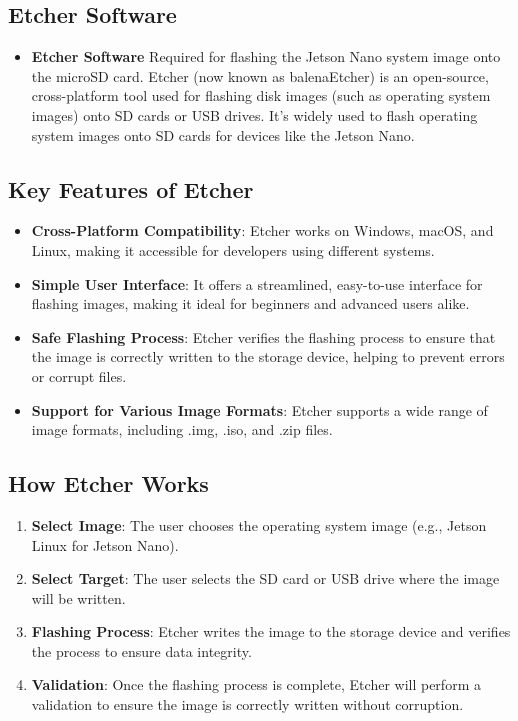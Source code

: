\subsection{Etcher Software}
\begin{itemize}
	\item \textbf{Etcher Software} Required for flashing the Jetson Nano system image onto the microSD card. Etcher (now known as balenaEtcher) is an open-source, cross-platform tool used for flashing disk images (such as operating system images) onto SD cards or USB drives. It's widely used to flash operating system images onto SD cards for devices like the Jetson Nano. \cite{BAC:2025}
\end{itemize}

\subsection*{Key Features of Etcher}
\begin{itemize}
	\item \textbf{Cross-Platform Compatibility}: Etcher works on Windows, macOS, and Linux, making it accessible for developers using different systems.
	\item \textbf{Simple User Interface}: It offers a streamlined, easy-to-use interface for flashing images, making it ideal for beginners and advanced users alike.
	\item \textbf{Safe Flashing Process}: Etcher verifies the flashing process to ensure that the image is correctly written to the storage device, helping to prevent errors or corrupt files.
	\item \textbf{Support for Various Image Formats}: Etcher supports a wide range of image formats, including .img, .iso, and .zip files.
\end{itemize}

\subsection*{How Etcher Works}
\begin{enumerate}
	\item \textbf{Select Image}: The user chooses the operating system image (e.g., Jetson Linux for Jetson Nano).
	\item \textbf{Select Target}: The user selects the SD card or USB drive where the image will be written.
	\item \textbf{Flashing Process}: Etcher writes the image to the storage device and verifies the process to ensure data integrity.
	\item \textbf{Validation}: Once the flashing process is complete, Etcher will perform a validation to ensure the image is correctly written without corruption.
\end{enumerate}

